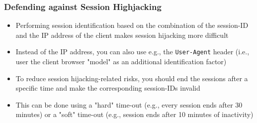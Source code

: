 \begin{frame}
    \frametitle{Defending against Session Highjacking}
    \begin{itemize}
        \item Performing session identification based on the combination of the session-ID and the IP address of the client makes session hijacking more difficult
        \item Instead of the IP address, you can also use e.g., the \texttt{User-Agent} header (i.e., user the client browser "model" as an additional identification factor)
        \item To reduce session hijacking-related risks, you should end the sessions after a specific time and make the corresponding session-IDs invalid
        \item This can be done using a "hard" time-out (e.g., every session ends after 30 minutes) or a "soft" time-out (e.g., session ends after 10 minutes of inactivity)
    \end{itemize}
\end{frame}




